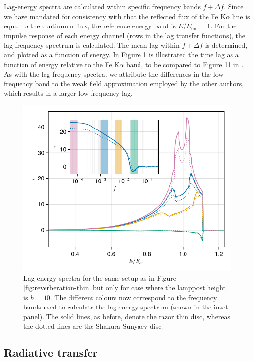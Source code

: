 \documentclass[fleqn,usenatbib]{mnras}
\newcommand{\FeKa}{Fe K$\alpha$ }
\begin{document}
Lag-energy spectra are calculated within specific frequency bands $f + \Delta
f$. Since we have mandated for consistency with \cite{cackett_modelling_2014}
that the reflected flux of the \FeKa line is equal to the continuum flux,
the reference energy band is $E/E_\text{em} = 1$.  For the impulse response of
each energy channel (rows in the lag transfer functions), the lag-frequency
spectrum is calculated. The mean lag within $f + \Delta f$ is determined, and
plotted as a function of energy. In Figure \ref{fig:lag-energy} is illustrated
the time lag as a function of energy relative to the \FeKa band,
to be compared to Figure 11 in \cite{cackett_modelling_2014}. As with the
lag-frequency spectra, we attribute the differences in the low frequency band to
the weak field approximation employed by the other authors, which results in a
larger low frequency lag.

\begin{figure}
	\centering
	\includegraphics[width=0.98\linewidth]{figures/reverberation.lag-energy.pdf}
	\caption{Lag-energy spectra for the same setup as in Figure
    \ref{fig:reverberation-thin} but only for case where the lamppost height is
$h=10$. The different colours now correspond to the frequency bands used to
calculate the lag-energy spectrum (shown in the inset panel). The solid lines,
as before, denote the razor thin disc, whereas the dotted lines are the
Shakura-Sunyaev disc.}
	\label{fig:lag-energy}
\end{figure}


\subsection{Radiative transfer}
\end{document}
